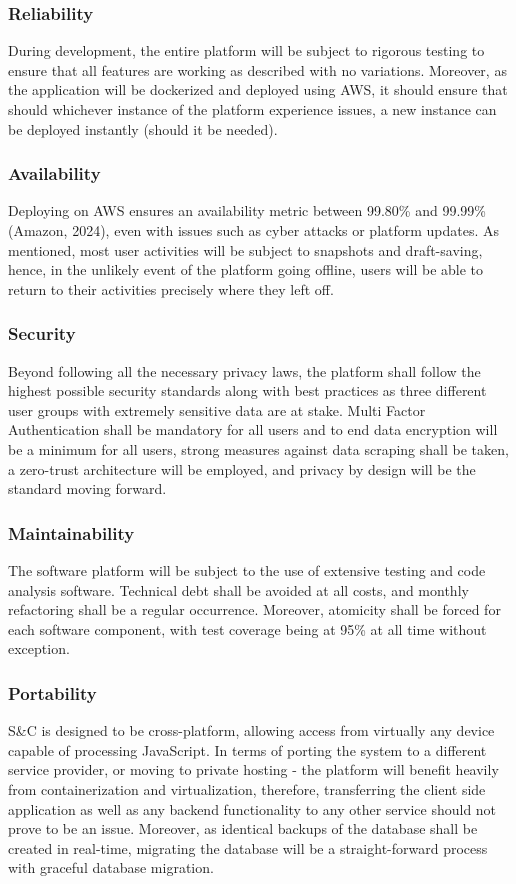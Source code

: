 \subsubsection{Reliability}
During development, the entire platform will be subject to rigorous testing to ensure that all features are working as described with no variations. Moreover, as the application will be dockerized and deployed using AWS, it should ensure that should whichever instance of the platform experience issues, a new instance can be deployed instantly (should it be needed). 
\subsubsection{Availability}
Deploying on AWS ensures an availability metric between 99.80\% and 99.99\% (Amazon, 2024), even with issues such as cyber attacks or platform updates. As mentioned, most user activities will be subject to snapshots and draft-saving, hence, in the unlikely event of the platform going offline, users will be able to return to their activities precisely where they left off.
\subsubsection{Security}
Beyond following all the necessary privacy laws, the platform shall follow the highest possible security standards along with best practices as three different user groups with extremely sensitive data are at stake. Multi Factor Authentication shall be mandatory for all users and to end data encryption will be a minimum for all users, strong measures against data scraping shall be taken, a zero-trust architecture will be employed, and privacy by design will be the standard moving forward.
\subsubsection{Maintainability}
The software platform will be subject to the use of extensive testing and code analysis software. Technical debt shall be avoided at all costs, and monthly refactoring shall be a regular occurrence. Moreover, atomicity shall be forced for each software component, with test coverage being at 95\% at all time without exception.
\subsubsection{Portability}
S\&C is designed to be cross-platform, allowing access from virtually any device capable of processing JavaScript. In terms of porting the system to a different service provider, or moving to private hosting - the platform will benefit heavily from containerization and virtualization, therefore, transferring the client side application as well as any backend functionality to any other service should not prove to be an issue. Moreover, as identical backups of the database shall be created in real-time, migrating the database will be a straight-forward process with graceful database migration.
